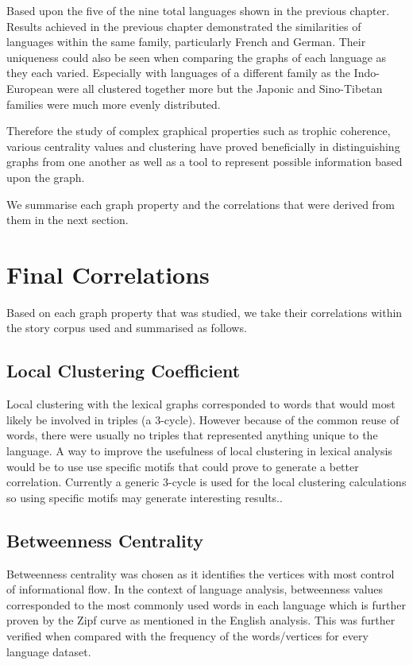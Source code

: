Based upon the five of the nine total languages shown in the previous chapter. Results achieved in the previous chapter demonstrated the similarities of languages within the same family, particularly French and German. Their uniqueness could also be seen when comparing the graphs of each language as they each varied. Especially with languages of a different family as the Indo-European were all clustered together more but the Japonic and Sino-Tibetan families were much more evenly distributed. 

Therefore the study of complex graphical properties such as trophic coherence, various centrality values and clustering have proved beneficially in distinguishing graphs from one another as well as a tool to represent possible information based upon the graph.  

We summarise each graph property and the correlations that were derived from them in the next section.

\section{Final Correlations}
Based on each graph property that was studied, we take their correlations within the story corpus used and summarised as follows.

\subsection{Local Clustering Coefficient}
Local clustering with the lexical graphs corresponded to words that would most likely be involved in triples (a 3-cycle). However because of the common reuse of words, there were usually no triples that represented anything unique to the language. A way to improve the usefulness of local clustering in lexical analysis would be to use use specific motifs that could prove to generate a better correlation. Currently a generic 3-cycle is used for the local clustering calculations so using specific motifs may generate interesting results..

\subsection{Betweenness Centrality}
Betweenness centrality was chosen as it identifies the vertices with most control of informational flow. In the context of language analysis, betweenness values corresponded to the most commonly used words in each language which is further proven by the Zipf curve as mentioned in the English analysis. This was further verified when compared with the frequency of the words/vertices for every language dataset.

